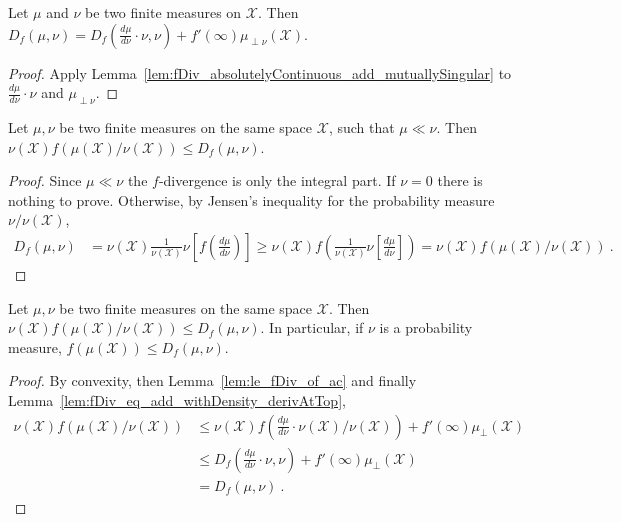 \begin{lemma}
  \label{lem:fDiv_eq_add_withDensity_derivAtTop}
  \leanok
  Let $\mu$ and $\nu$ be two finite measures on $\mathcal X$.
  Then $D_f(\mu, \nu) = D_f(\frac{d\mu}{d\nu}\cdot \nu, \nu) + f'(\infty) \mu_{\perp \nu}(\mathcal X)$.
\end{lemma}

\begin{proof}\leanok
{}
Apply Lemma~\ref{lem:fDiv_absolutelyContinuous_add_mutuallySingular} to $\frac{d\mu}{d\nu}\cdot \nu$ and $\mu_{\perp \nu}$.
\end{proof}


\begin{lemma}
  \label{lem:le_fDiv_of_ac}
  \leanok
  Let $\mu, \nu$ be two finite measures on the same space $\mathcal X$, such that $\mu \ll \nu$. Then $\nu(\mathcal X) f(\mu(\mathcal X)/\nu(\mathcal X)) \le D_f(\mu, \nu)$.
\end{lemma}

\begin{proof}\leanok
Since $\mu \ll \nu$ the $f$-divergence is only the integral part. If $\nu = 0$ there is nothing to prove. Otherwise, by Jensen's inequality for the probability measure $\nu / \nu(\mathcal X)$,
\begin{align*}
D_f(\mu, \nu)
&= \nu(\mathcal X) \frac{1}{\nu(\mathcal X)}\nu\left[ f\left( \frac{d\mu}{d\nu} \right) \right]
\ge \nu(\mathcal X) f\left( \frac{1}{\nu(\mathcal X)}\nu\left[\frac{d\mu}{d\nu} \right] \right)
= \nu(\mathcal X) f(\mu(\mathcal X)/\nu(\mathcal X))
\: .
\end{align*}

\end{proof}


\begin{lemma}
  \label{lem:le_fDiv}
  \leanok
  Let $\mu, \nu$ be two finite measures on the same space $\mathcal X$. Then $\nu(\mathcal X) f(\mu(\mathcal X)/\nu(\mathcal X)) \le D_f(\mu, \nu)$. In particular, if $\nu$ is a probability measure, $f(\mu(\mathcal X)) \le D_f(\mu, \nu)$.
\end{lemma}

\begin{proof}\leanok
{}
By convexity, then Lemma~\ref{lem:le_fDiv_of_ac} and finally Lemma~\ref{lem:fDiv_eq_add_withDensity_derivAtTop},
\begin{align*}
\nu(\mathcal X) f(\mu(\mathcal X)/\nu(\mathcal X))
&\le \nu(\mathcal X) f(\frac{d\mu}{d\nu}\cdot \nu (\mathcal X)/\nu(\mathcal X)) + f'(\infty)\mu_{\perp}(\mathcal X)
\\
&\le D_f(\frac{d\mu}{d\nu}\cdot \nu , \nu) + f'(\infty)\mu_{\perp}(\mathcal X)
\\
&= D_f(\mu, \nu)
\: .
\end{align*}
\end{proof}


